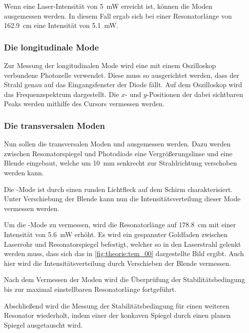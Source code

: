    Wenn eine Laser-Intensität von \SI{5}{\milli\watt} erreicht ist,
    können die Moden ausgemessen werden.
    In diesem Fall ergab sich bei einer Resonatorlänge von \SI{162.9}{\centi\meter} eine Intensität von \SI{5.1}{\milli\watt}.


\subsubsection{Die longitudinale Mode}

    Zur Messung der longitudinalen Mode wird eine mit einem Oszilloskop verbundene Photozelle verwendet.
    Diese muss so ausgerichtet werden,
    dass der Strahl genau auf das Eingangsfenster der Diode fällt.
    Auf dem Oszilloskop wird das Frequenzspektrum dargestellt.
    Die $x$- und $y$-Positionen der dabei sichtbaren Peaks
    werden mithilfe des Cursors vermessen werden.


\subsubsection{Die transversalen Moden}

    Nun sollen die transversalen Moden  und  ausgemessen werden.
    Dazu werden zwischen Resonatorspiegel und Photodiode eine Vergrößerungslinse und eine Blende eingebaut,
    welche um \SI{10}{\milli\meter} senkrecht zur Strahlrichtung verschoben werden kann.

    Die -Mode ist durch einen runden Lichtfleck auf dem Schirm charakterisiert.
    Unter Verschiebung der Blende kann nun die Intensitätsverteilung dieser Mode vermessen werden.

    Um die -Mode zu vermessen,
    wird die Resonatorlänge auf \SI{178.8}{\centi\meter} mit einer Intensität von \SI{5.6}{\milli\watt} erhöht.
    Es wird ein gespannter Goldfaden zwischen Laserrohr und Resonatorspiegel befestigt,
    welcher so in den Laserstrahl gelenkt werden muss,
    dass sich das in \autoref{fig:theorie:tem_00} dargestellte Bild ergibt.
    Auch hier wird die Intensitätsverteilung durch Verschieben der Blende vermessen.


    Nach dem Vermessen der Moden wird die Überprüfung der Stabilitätsbedingung bis zur maximal einstellbaren Resonatorlänge fortgeführt.

    Abschließend wird die Messung der Stabilitätsbedingung für einen weiteren Resonator wiederholt,
    indem einer der konkaven Spiegel durch einen planen Spiegel ausgetauscht wird.
